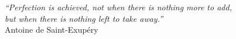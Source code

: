 \cleardoublepage
\thispagestyle{plain}

\vspace*{8cm}

\begin{flushright}
  \textsl{``Perfection is achieved, not when there is nothing more to add, \\
           but when there is nothing left to take away.''} \\
  \vspace*{1.5cm}
           Antoine de Saint-Exupéry
\end{flushright}
